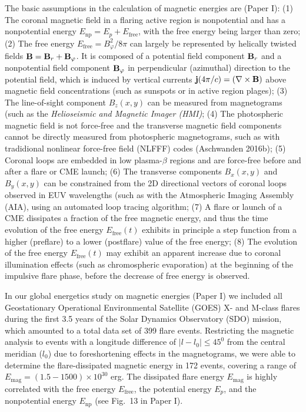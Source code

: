 \documentclass[10pt,preprint]{aastex}  %
\begin{document}
The basic assumptions in the calculation of magnetic energies are (Paper I):
(1) The coronal magnetic field in a flaring active region is
nonpotential and has a nonpotential energy $E_{\mathrm{np}} = E_p
+ E_{\mathrm{free}}$, with the free energy being larger than zero; 
(2) The free energy $E_{\mathrm{free}}=B_{\varphi}^2/8\pi$ can largely be 
represented by helically twisted fields 
${\bf B} = {\bf B}_r + {\bf B}_\varphi$. It is composed of a
potential field component ${\bf B}_r$ and a nonpotential field component
${\bf B}_{\varphi}$ in perpendicular (azimuthal) direction to the potential field, 
which is induced by vertical currents ${\bf j} (4 \pi/c) = (\nabla \times {\bf B})$
above magnetic field concentrations (such as sunspots or in active region
plages); 
(3) The line-of-sight component $B_z(x,y)$ can be measured from 
magnetograms (such as the {\it Helioseismic and Magnetic Imager (HMI)}; 
(4) The photospheric magnetic field is not force-free and the
transverse magnetic field components cannot be directly measured
from photospheric magnetograms, such as with tradidional
nonlinear force-free field (NLFFF) codes (Aschwanden 2016b);
(5) Coronal loops are embedded in low plasma-$\beta$ regions
and are force-free before and after a flare or CME launch;
(6) The transverse components $B_x(x,y)$ and
$B_y(x,y)$ can be constrained from the 2D directional vectors of coronal
loops observed in EUV wavelengths (such as with the Atmospheric
Imaging Assembly (AIA), using an automated loop tracing algorithm; 
(7) A flare or launch of a CME dissipates a fraction of the
free magnetic energy, and thus the time evolution of the free
energy $E_{\mathrm{free}}(t)$ exhibits in principle a step function 
from a higher (preflare) to a lower (postflare) value of the
free energy;
(8) The evolution of the free energy $E_{\mathrm{free}}(t)$ may 
exhibit an apparent increase due to coronal
illumination effects (such as chromospheric evaporation) at the 
beginning of the impulsive flare phase, before the decrease of 
free energy is observed.

In our global energetics study on magnetic energies (Paper I) 
we included all Geostationary Operational Environmental
Satellite (GOES) X- and M-class flares during the first 3.5
years of the Solar Dynamics Observatory (SDO) mission, 
which amounted to a total data set of
399 flare events. Restricting the magnetic analysis to events
with a longitude difference of $|l-l_0| \le 45^0$ from the 
central meridian ($l_0$) due to foreshortening effects in the
magnetograms, we were able to determine the flare-dissipated
magnetic energy in 172 events, covering a range of 
$E_{\mathrm{mag}} = (1.5 - 1500) \times 10^{30}$ erg.
The dissipated flare energy $E_{\mathrm{mag}}$ is highly correlated with
the free energy $E_{\mathrm{free}}$, the potential energy $E_p$, and the
nonpotential energy $E_{\mathrm{np}}$ (see Fig.~13 in Paper I).
\end{document}
